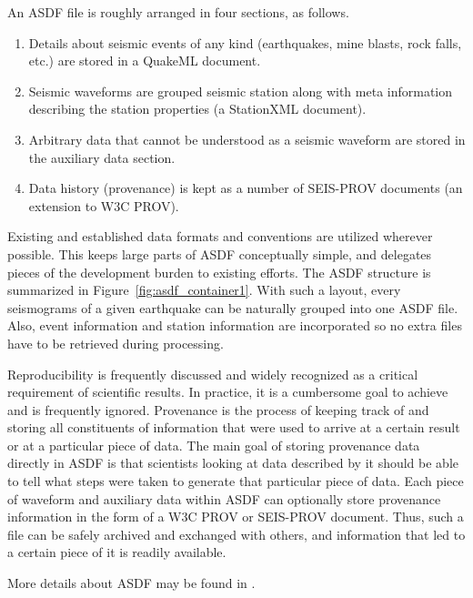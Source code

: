 An ASDF file is roughly arranged in four sections, as follows.
\begin{enumerate}
    \item Details about seismic events of any kind (earthquakes, mine blasts,
        rock falls, etc.) are stored in a QuakeML document.
    \item Seismic waveforms are grouped seismic station
        along with meta information describing the station properties
        (a StationXML document).
    \item Arbitrary data that cannot be understood as a seismic waveform are
        stored in the auxiliary data section.
    \item Data history (provenance) is kept as a number of SEIS-PROV
     documents (an extension to W3C PROV).
\end{enumerate}

Existing and established data formats and conventions are utilized wherever
possible. This keeps large parts of ASDF conceptually simple, and delegates
pieces of the development burden to existing efforts. The ASDF structure is
summarized in Figure~\ref{fig:asdf_container1}. With such a layout, every
seismograms of a given earthquake can be naturally grouped into one ASDF file.
Also, event information and station information are incorporated so no extra
files have to be retrieved during processing.

Reproducibility is frequently discussed and widely recognized as a critical
requirement of scientific results. In practice, it is a cumbersome goal to
achieve and is frequently ignored. Provenance is the process of keeping track of
and storing all constituents of information that were used to arrive at a
certain result or at a particular piece of data. The main goal of storing
provenance data directly in ASDF is that scientists looking at data described by it should be able to tell what
steps were taken to generate that particular piece of data. Each piece of
waveform and auxiliary data within ASDF can optionally store provenance
information in the form of a W3C PROV or SEIS-PROV document. Thus, such a file
can be safely archived and exchanged with others, and information that led to a
certain piece of it is readily available.

More details about ASDF may be found in \cite{krischer2016adaptable}.

